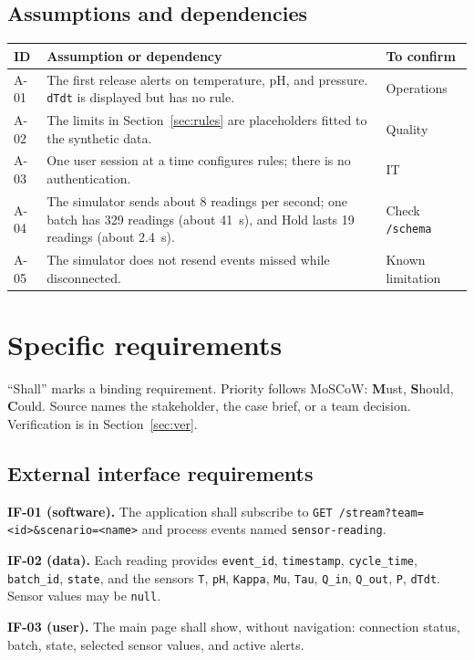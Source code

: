 \documentclass[10pt,a4paper]{article}
\newcommand{\head}[1]{\textbf{\color{courseblue}#1}}
\newcommand{\field}[1]{\texttt{#1}}
\begin{document}
\subsection{Assumptions and dependencies}
\begin{longtable}{@{}L{14mm}L{112mm}L{30mm}@{}}
\toprule \head{ID} & \head{Assumption or dependency} & \head{To confirm}\\ \midrule \endhead
A-01 & The first release alerts on temperature, pH, and pressure. \field{dTdt} is displayed but has no rule. & Operations\\
A-02 & The limits in Section~\ref{sec:rules} are placeholders fitted to the synthetic data. & Quality\\
A-03 & One user session at a time configures rules; there is no authentication. & IT\\
A-04 & The simulator sends about 8 readings per second; one batch has 329 readings (about 41~s), and Hold lasts 19 readings (about 2.4~s). & Check \field{/schema}\\
A-05 & The simulator does not resend events missed while disconnected. & Known limitation\\
\bottomrule
\end{longtable}

\section{Specific requirements}
``Shall'' marks a binding requirement. Priority follows MoSCoW: \textbf{M}ust, \textbf{S}hould, \textbf{C}ould. Source names the stakeholder, the case brief, or a team decision. Verification is in Section~\ref{sec:ver}.

\subsection{External interface requirements}\label{sec:if}
\textbf{IF-01 (software).} The application shall subscribe to \field{GET /stream?team=<id>\&scenario=<name>} and process events named \field{sensor-reading}.

\textbf{IF-02 (data).} Each reading provides \field{event\_id}, \field{timestamp}, \field{cycle\_time}, \field{batch\_id}, \field{state}, and the sensors \field{T}, \field{pH}, \field{Kappa}, \field{Mu}, \field{Tau}, \field{Q\_in}, \field{Q\_out}, \field{P}, \field{dTdt}. Sensor values may be \field{null}.

\textbf{IF-03 (user).} The main page shall show, without navigation: connection status, batch, state, selected sensor values, and active alerts.
\end{document}
